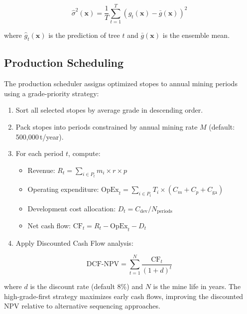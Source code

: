\documentclass[12pt,a4paper]{article}
\begin{document}
\begin{equation}
    \hat{\sigma}^2(\mathbf{x}) = \frac{1}{T} \sum_{t=1}^{T} \left( \hat{g}_t(\mathbf{x}) - \bar{g}(\mathbf{x}) \right)^2
\end{equation}

where $\hat{g}_t(\mathbf{x})$ is the prediction of tree $t$ and $\bar{g}(\mathbf{x})$ is the ensemble mean.

\subsection{Production Scheduling}
\label{sec:scheduling}

The production scheduler assigns optimized stopes to annual mining periods using a grade-priority strategy:

\begin{enumerate}
    \item Sort all selected stopes by average grade in descending order.
    \item Pack stopes into periods constrained by annual mining rate $M$ (default: 500{,}000\,t/year).
    \item For each period $t$, compute:
    \begin{itemize}
        \item Revenue: $R_t = \sum_{i \in P_t} m_i \times r \times p$
        \item Operating expenditure: $\text{OpEx}_t = \sum_{i \in P_t} T_i \times (C_m + C_p + C_{\text{ga}})$
        \item Development cost allocation: $D_t = C_{\text{dev}} / N_{\text{periods}}$
        \item Net cash flow: $\text{CF}_t = R_t - \text{OpEx}_t - D_t$
    \end{itemize}
    \item Apply Discounted Cash Flow analysis:
\end{enumerate}

\begin{equation}
    \text{DCF-NPV} = \sum_{t=1}^{N} \frac{\text{CF}_t}{(1 + d)^t}
\end{equation}

where $d$ is the discount rate (default 8\%) and $N$ is the mine life in years. The high-grade-first strategy maximizes early cash flows, improving the discounted NPV relative to alternative sequencing approaches.

\end{document}
